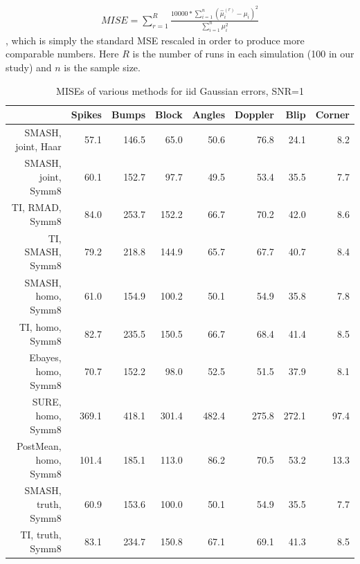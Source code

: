 \documentclass[12pt]{article}
\begin{document}
\begin{eqnarray}\label{eq:mise}
MISE=\sum_{r=1}^R{\frac{10000*\sum_{i=1}^n(\hat{\mu}^{(r)}_i-\mu_i)^2}{\sum_{i=1}^n \mu_i^2}}
\end{eqnarray}
, which is simply the standard MSE rescaled in order to produce more comparable numbers. Here $R$ is the number of runs in each simulation (100 in our study) and $n$ is the sample size.
\begin{table}[ht]
\centering
\begin{tabular}{rrrrrrrr}
  \hline
 & Spikes & Bumps & Block & Angles & Doppler & Blip & Corner \\
  \hline
SMASH, joint, Haar & 57.1 & 146.5 & 65.0 & 50.6 & 76.8 & 24.1 & 8.2 \\
  SMASH, joint, Symm8 & 60.1 & 152.7 & 97.7 & 49.5 & 53.4 & 35.5 & 7.7 \\
  TI, RMAD, Symm8 & 84.0 & 253.7 & 152.2 & 66.7 & 70.2 & 42.0 & 8.6 \\
  TI, SMASH, Symm8 & 79.2 & 218.8 & 144.9 & 65.7 & 67.7 & 40.7 & 8.4 \\
  SMASH, homo, Symm8 & 61.0 & 154.9 & 100.2 & 50.1 & 54.9 & 35.8 & 7.8 \\
  TI, homo, Symm8 & 82.7 & 235.5 & 150.5 & 66.7 & 68.4 & 41.4 & 8.5 \\
  Ebayes, homo, Symm8 & 70.7 & 152.2 & 98.0 & 52.5 & 51.5 & 37.9 & 8.1 \\
  SURE, homo, Symm8 & 369.1 & 418.1 & 301.4 & 482.4 & 275.8 & 272.1 & 97.4 \\
  PostMean, homo, Symm8 & 101.4 & 185.1 & 113.0 & 86.2 & 70.5 & 53.2 & 13.3 \\
  SMASH, truth, Symm8 & 60.9 & 153.6 & 100.0 & 50.1 & 54.9 & 35.5 & 7.7 \\
  TI, truth, Symm8 & 83.1 & 234.7 & 150.8 & 67.1 & 69.1 & 41.3 & 8.5 \\
   \hline
\end{tabular}
\caption{MISEs of various methods for iid Gaussian errors, SNR=1}
\label{table:homo1}
\end{table}
\end{document}
